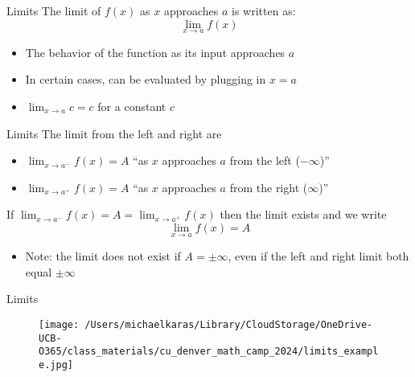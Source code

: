 \documentclass[aspectratio=169]{beamer}
\begin{document}
\begin{frame}{Limits}\label{main1}
	The limit of \( f(x) \) as \( x \) approaches \( a \) is written as:
\[
\lim_{x \to a} f(x)
\]
\begin{itemize}
\begin{itemize}
	\item The behavior of the function as its input approaches \( a \)
	\item In certain cases, can be evaluated by plugging in \( x = a \)
	\item \( \lim_{x \to a} c = c \) for a constant \( c \)
\end{itemize}
\end{itemize}

\end{frame}

\begin{frame}{Limits}\label{main1}
The limit from the left and right are
\begin{itemize}
\begin{itemize}
    \item \(\lim_{x \to a^-} f(x) = A\) “as \(x\) approaches \(a\) from the left (\(-\infty\))”
    \item \(\lim_{x \to a^+} f(x) = A\) “as \(x\) approaches \(a\) from the right (\(\infty\))”
\end{itemize}
\end{itemize}
If \(\lim_{x \to a^-} f(x) = A = \lim_{x \to a^+} f(x)\) then the limit exists and we write
\[
\lim_{x \to a} f(x) = A
\]
\begin{itemize}
    \item Note: the limit does not exist if \(A = \pm\infty\), even if the left and right limit both equal \(\pm\infty\)
\end{itemize}
\end{frame}

\begin{frame}{Limits}\label{main1}
    \begin{figure}
        \centering
        \texttt{[image: /Users/michaelkaras/Library/CloudStorage/OneDrive-UCB-O365/class\_materials/cu\_denver\_math\_camp\_2024/limits\_example.jpg]}
    \end{figure}
\end{frame}
\end{document}

